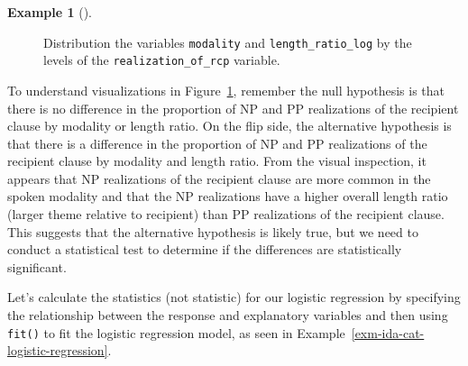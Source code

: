 \documentclass[
  letterpaper,
]{latex/krantz}
\theoremstyle{definition}
\newtheorem{example}{Example}[chapter]
\theoremstyle{remark}
\begin{document}
\begin{example}[]
\begin{figure}[H]
\begin{minipage}{0.50\linewidth}
{}


\end{minipage}%

\caption{\label{fig-ida-cat-bivariate-length-ratio-log}Distribution the
variables \texttt{modality} and \texttt{length\_ratio\_log} by the
levels of the \texttt{realization\_of\_rcp} variable.}

\end{figure}%

\end{example}

To understand visualizations in
Figure~\ref{fig-ida-cat-bivariate-length-ratio-log}, remember the null
hypothesis is that there is no difference in the proportion of NP and PP
realizations of the recipient clause by modality or length ratio. On the
flip side, the alternative hypothesis is that there is a difference in
the proportion of NP and PP realizations of the recipient clause by
modality and length ratio. From the visual inspection, it appears that
NP realizations of the recipient clause are more common in the spoken
modality and that the NP realizations have a higher overall length ratio
(larger theme relative to recipient) than PP realizations of the
recipient clause. This suggests that the alternative hypothesis is
likely true, but we need to conduct a statistical test to determine if
the differences are statistically significant.

Let's calculate the statistics (not statistic) for our logistic
regression by specifying the relationship between the response and
explanatory variables and then using \texttt{fit()} to fit the logistic
regression model, as seen in
Example~\ref{exm-ida-cat-logistic-regression}.
\end{document}
